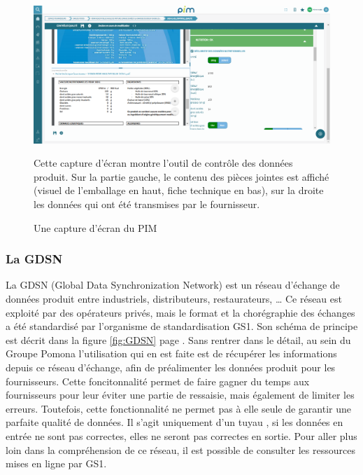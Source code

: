                \begin{figure}[htpb]
                    \begin{center}
                    \includegraphics[width=\linewidth]{img/Ecran PIM.png}
                    \end{center}
                    Cette capture d'écran montre l'outil de contrôle des données produit. Sur la partie gauche, le contenu des pièces jointes est affiché (visuel de l'emballage en haut, fiche technique en bas), sur la droite les données qui ont été transmises par le fournisseur.
                    \caption{Une capture d'écran du PIM}
                    \label{fig:ecran_PIM}
                \end{figure} 

                \subsubsection{La GDSN}

                La GDSN (Global Data Synchronization Network) est un réseau d'échange de données produit entre industriels, distributeurs, restaurateurs, \dots
                Ce réseau est exploité par des opérateurs privés, mais le format et la chorégraphie des échanges a été standardisé par l'organisme de standardisation GS1.
                Son schéma de principe est décrit dans la figure \ref{fig:GDSN} page \pageref{fig:GDSN}.
                Sans rentrer dans le détail, au sein du Groupe Pomona l'utilisation qui en est faite est de récupérer les informations depuis ce réseau d'échange, afin de préalimenter les données produit pour les fournisseurs.
                Cette foncitonnalité permet de faire gagner du temps aux fournisseurs pour leur éviter une partie de ressaisie, mais également de limiter les erreurs.
                Toutefois, cette fonctionnalité ne permet pas à elle seule de garantir une parfaite qualité de données.
                Il s'agit uniquement d'un \og tuyau \fg, si les données en entrée ne sont pas correctes, elles ne seront pas correctes en sortie.
                Pour aller plus loin dans la compréhension de ce réseau, il est possible de consulter les ressources mises en ligne par GS1\cite{GDSN_GS1_FR}\cite{GDSN_GS1_GLOBAL}.

